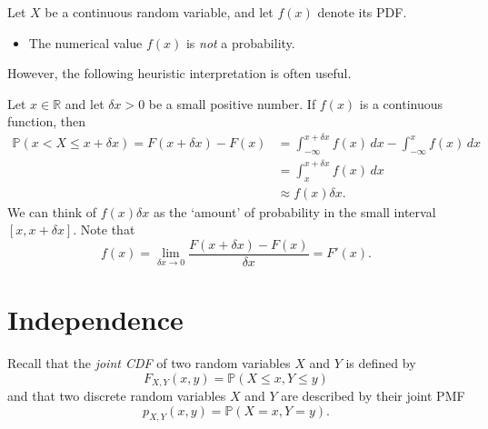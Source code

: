 \documentclass[lecture]{csm}
\newcommand{\prob}{\mathbb{P}}
\newcommand{\R}{\mathbb{R}}
\def\it{\item}
\def\bit{\begin{itemize}}
\def\eit{\end{itemize}}
\def\ben{\begin{enumerate}}
\def\een{\end{enumerate}}
\newcommand{\lt}{<}
\begin{document}
\newpage

%
%

\begin{remark}
Let $X$ be a continuous random variable, and let $f(x)$ denote its PDF. 
\bit
\it The numerical value $f(x)$ is \emph{not} a probability. 
\eit
However, the following heuristic interpretation is often useful.

\vspace*{2ex}
Let $x\in\R$ and let $\delta x >0$ be a small positive number. If $f(x)$ is a continuous function, then
\begin{align*}
\prob(x\lt X \leq x+\delta x) 	
	= F(x+\delta x) - F(x) 
	& = \int_{-\infty}^{x+\delta x} f(x)\,dx - \int_{-\infty}^{x} f(x)\,dx \\
	& = \int_{x}^{x+\delta x} f(x)\,dx \\
	& \approx f(x)\delta x.
\end{align*}
We can think of $f(x)\delta x$ as the `amount' of probability in the small interval $[x,x+\delta x]$. Note that
\[
f(x) = \lim_{\delta x \to 0} \frac{F(x+\delta x) - F(x)}{\delta x} = F'(x).
\]
\end{remark}

\newpage
\section{Independence}
Recall that the \emph{joint CDF} of two random variables $X$ and $Y$ is defined by
\[
F_{X,Y}(x,y) = \prob(X\leq x, Y\leq y) 
\]
and that two discrete random variables $X$ and $Y$ are described by their joint PMF
\[
p_{X,Y}(x,y)=\prob(X=x,Y=y).
\]
\end{document}
